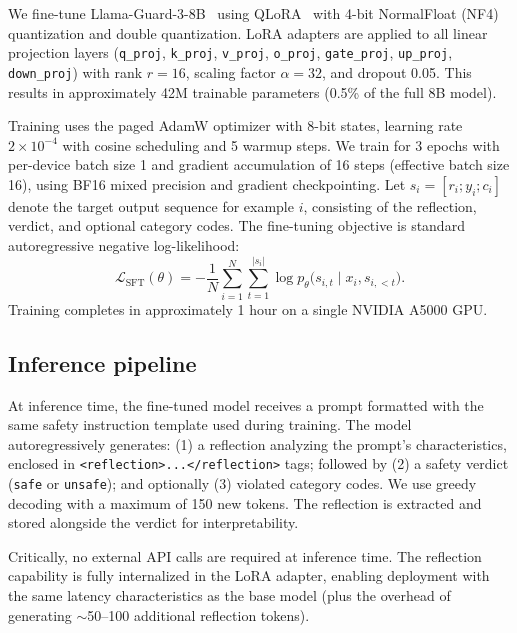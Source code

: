 \documentclass[11pt]{article}
\begin{document}
We fine-tune Llama-Guard-3-8B~\citep{metallamaguard3} using QLoRA~\citep{dettmers2024qlora} with 4-bit NormalFloat (NF4) quantization and double quantization. LoRA adapters are applied to all linear projection layers (\texttt{q\_proj}, \texttt{k\_proj}, \texttt{v\_proj}, \texttt{o\_proj}, \texttt{gate\_proj}, \texttt{up\_proj}, \texttt{down\_proj}) with rank $r = 16$, scaling factor $\alpha = 32$, and dropout 0.05. This results in approximately 42M trainable parameters (0.5\% of the full 8B model).

Training uses the paged AdamW optimizer with 8-bit states, learning rate $2 \times 10^{-4}$ with cosine scheduling and 5 warmup steps. We train for 3 epochs with per-device batch size 1 and gradient accumulation of 16 steps (effective batch size 16), using BF16 mixed precision and gradient checkpointing. Let $s_i = [r_i; y_i; c_i]$ denote the target output sequence for example $i$, consisting of the reflection, verdict, and optional category codes. The fine-tuning objective is standard autoregressive negative log-likelihood:
\begin{equation}
  \mathcal{L}_{\text{SFT}}(\theta) = - \frac{1}{N} \sum_{i=1}^{N} \sum_{t=1}^{|s_i|}
  \log p_{\theta}\bigl(s_{i,t} \mid x_i, s_{i,<t}\bigr).
\end{equation}
Training completes in approximately 1 hour on a single NVIDIA A5000 GPU.

\subsection{Inference pipeline}

At inference time, the fine-tuned model receives a prompt formatted with the same safety instruction template used during training. The model autoregressively generates: (1) a reflection analyzing the prompt's characteristics, enclosed in \texttt{<reflection>...</reflection>} tags; followed by (2) a safety verdict (\texttt{safe} or \texttt{unsafe}); and optionally (3) violated category codes. We use greedy decoding with a maximum of 150 new tokens. The reflection is extracted and stored alongside the verdict for interpretability.

Critically, no external API calls are required at inference time. The reflection capability is fully internalized in the LoRA adapter, enabling deployment with the same latency characteristics as the base model (plus the overhead of generating $\sim$50--100 additional reflection tokens).

\end{document}
